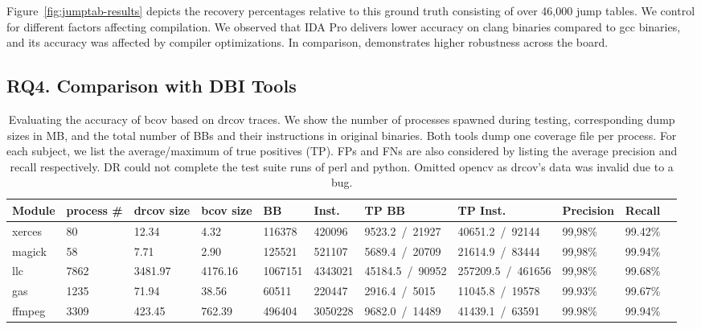 Figure~\ref{fig:jumptab-results} depicts the recovery percentages relative to this ground truth consisting of over 46,000 jump tables.
We control for different factors affecting compilation.
We observed that IDA Pro delivers lower accuracy on \textsf{clang} binaries compared to \textsf{gcc} binaries, and its accuracy was affected by compiler optimizations.
In comparison, {\bcov} demonstrates higher robustness across the board.



\subsection*{RQ4. Comparison with DBI Tools}



\begin{table}[t!]
	\centering
	\setlength\tabcolsep{8.5pt}
	\small
	\caption{Evaluating the accuracy of \textsf{bcov} based on \textsf{drcov} traces. 
    We show the number of processes spawned during testing, corresponding dump sizes in MB,
    and the total number of BBs and their instructions in original binaries.
    Both tools dump one coverage file per process.
    For each subject, we list the average/maximum of true positives (TP).
    FPs and FNs are also considered by listing the average precision and recall respectively.		 
    DR could not complete the test suite runs of \textsf{perl} and \textsf{python}.
    Omitted \textsf{opencv} as \textsf{drcov}'s data was invalid due to a bug. 
    }
    \label{tab:coverage-accuracy}        
	\begin{tabularx}{0.99\textwidth}{@{}lllllllllll@{}}
        \\
		\textbf{Module} &
		\textbf{process \#} &
		\textbf{drcov size} &
		\textbf{bcov size} &
		\textbf{BB} &
		\textbf{Inst.} &
		\textbf{TP BB} &
		\textbf{TP Inst.} &
		\textbf{Precision} &
		\textbf{Recall} \\		
		\toprule
		
		xerces   & 80     & 12.34     & 4.32     & 116378   & 420096   & 9523.2~/~21927    & 40651.2~/~92144     & 99,98\%   &  99.42\%   \\ 
		magick   & 58     & 7.71      & 2.90     & 125521   & 521107   & 5689.4~/~20709    & 21614.9~/~83444     & 99,98\%   &  99.94\%    \\ 
		llc      & 7862   & 3481.97   & 4176.16  & 1067151  & 4343021  & 45184.5~/~90952   & 257209.5~/~461656   & 99,98\%   &  99.68\%  \\ 		
		gas      & 1235   & 71.94     & 38.56    & 60511    & 220447   & 2916.4~/~5015     & 11045.8~/~19578     & 99.93\%   &  99.67\%   \\ 
		ffmpeg   & 3309   & 423.45    & 762.39   & 496404   & 3050228  & 9682.0~/~14489    & 41439.1~/~63591     & 99.98\%   &  99.94\%   \\ 
		
		\bottomrule
	\end{tabularx}
\end{table}


